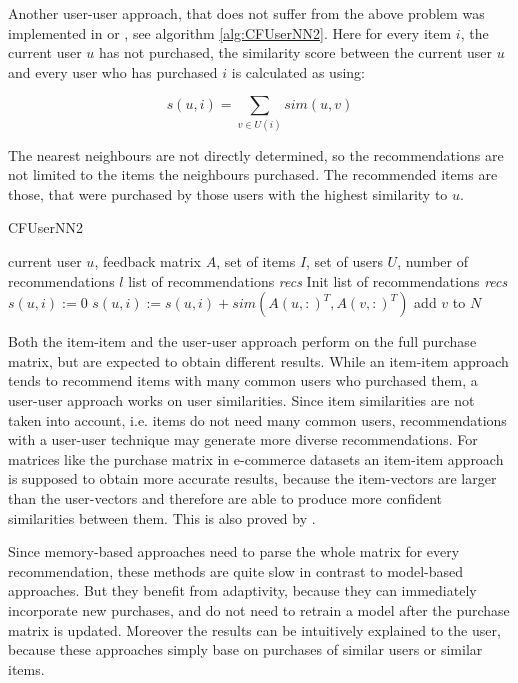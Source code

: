 \documentclass[10pt]{reportMaster}
\begin{document}
Another user-user approach, that does not suffer from the above problem was implemented in \cite{efficientTopN} or \cite{effectiveLatentModels}, see algorithm \ref{alg:CFUserNN2}.
Here for every item $i$, the current user $u$ has not purchased, the similarity score between the current user $u$ and every user who has purchased $i$ is calculated as using: 

\begin{equation}
	s(u,i) = \sum_{v \in U(i)}{sim(u,v)}
\end{equation}

The nearest neighbours are not directly determined, so the recommendations are not limited to the items the neighbours purchased.
The recommended items are those, that were purchased by those users with the highest similarity to $u$.

\begin{algorithm}
	\caption{CFUserNN2}
	\label{alg:CFUserNN2}
	\begin{algorithmic}[1]
		\Require current user $u$, feedback matrix $A$, set of items $I$, set of users $U$, number of recommendations $l$
		\Ensure list of recommendations \textit{recs}
		\State Init list of recommendations \textit{recs}
			\State $s(u,i) := 0$
				\State $s(u,i) := s(u,i) + sim(A(u,:)^T, A(v,:)^T)$
			\EndFor
				\State add $v$ to $N$
			\EndIf
		\EndFor
	\end{algorithmic}	
\end{algorithm}

Both the item-item and the user-user approach perform on the full purchase matrix, but are expected to obtain different results.
While an item-item approach tends to recommend items with many common users who purchased them, a user-user approach works on user similarities.
Since item similarities are not taken into account, i.e. items do not need many common users, recommendations with a user-user technique may generate more diverse recommendations.
For matrices like the purchase matrix in e-commerce datasets an item-item approach is supposed to obtain more accurate results, because the item-vectors are larger than the user-vectors and therefore are able to produce more confident similarities between them.
This is also proved by \cite{itemItemAlgorithms}. 

Since memory-based approaches need to parse the whole matrix for every recommendation, these methods are quite slow in contrast to model-based approaches.
But they benefit from adaptivity, because they can immediately incorporate new purchases, and do not need to retrain a model after the purchase matrix is updated.
Moreover the results can be intuitively explained to the user, because these approaches simply base on purchases of similar users or similar items.
\end{document}
